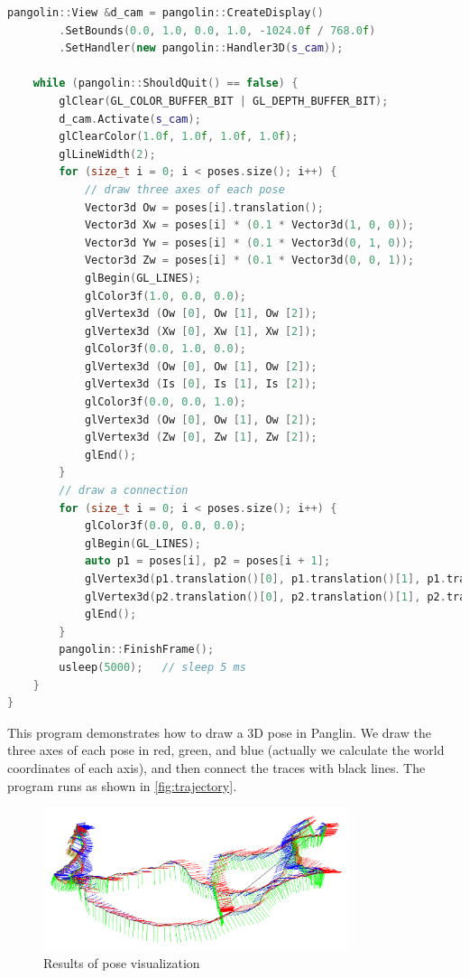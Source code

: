 \begin{lstlisting}[language=c++,caption=slambook2/ch3/examples/plotTrajectory.cpp]
    pangolin::View &d_cam = pangolin::CreateDisplay()
        .SetBounds(0.0, 1.0, 0.0, 1.0, -1024.0f / 768.0f)
        .SetHandler(new pangolin::Handler3D(s_cam));
    
    while (pangolin::ShouldQuit() == false) {
        glClear(GL_COLOR_BUFFER_BIT | GL_DEPTH_BUFFER_BIT);
        d_cam.Activate(s_cam);
        glClearColor(1.0f, 1.0f, 1.0f, 1.0f);
        glLineWidth(2);
        for (size_t i = 0; i < poses.size(); i++) {
            // draw three axes of each pose
            Vector3d Ow = poses[i].translation();
            Vector3d Xw = poses[i] * (0.1 * Vector3d(1, 0, 0));
            Vector3d Yw = poses[i] * (0.1 * Vector3d(0, 1, 0));
            Vector3d Zw = poses[i] * (0.1 * Vector3d(0, 0, 1));
            glBegin(GL_LINES);
            glColor3f(1.0, 0.0, 0.0);
            glVertex3d (Ow [0], Ow [1], Ow [2]);
            glVertex3d (Xw [0], Xw [1], Xw [2]);
            glColor3f(0.0, 1.0, 0.0);
            glVertex3d (Ow [0], Ow [1], Ow [2]);
            glVertex3d (Is [0], Is [1], Is [2]);
            glColor3f(0.0, 0.0, 1.0);
            glVertex3d (Ow [0], Ow [1], Ow [2]);
            glVertex3d (Zw [0], Zw [1], Zw [2]);
            glEnd();
        }
        // draw a connection
        for (size_t i = 0; i < poses.size(); i++) {
            glColor3f(0.0, 0.0, 0.0);
            glBegin(GL_LINES);
            auto p1 = poses[i], p2 = poses[i + 1];
            glVertex3d(p1.translation()[0], p1.translation()[1], p1.translation()[2]);
            glVertex3d(p2.translation()[0], p2.translation()[1], p2.translation()[2]);
            glEnd();
        }
        pangolin::FinishFrame();
        usleep(5000);   // sleep 5 ms
    }
}
\end{lstlisting}

This program demonstrates how to draw a 3D pose in Panglin. We draw the three axes of each pose in red, green, and blue (actually we calculate the world coordinates of each axis), and then connect the traces with black lines. The program runs as shown in \autoref {fig:trajectory}.

\begin{figure}[!htp]
    \centering
    \includegraphics[width=0.8\textwidth]{rigidMotion/trajectory.pdf}
    \caption {Results of pose visualization}
    \label{fig:trajectory}
\end{figure}


